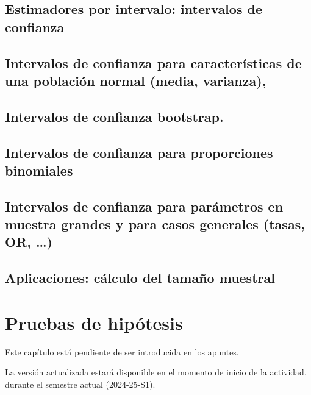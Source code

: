 \documentclass[
  a4paper,
  DIV=11,
  numbers=noendperiod]{scrreprt}
\begin{document}
\section{Estimadores por intervalo: intervalos de
confianza}\label{estimadores-por-intervalo-intervalos-de-confianza}

\section{Intervalos de confianza para características de una población
normal (media,
varianza),}\label{intervalos-de-confianza-para-caracteruxedsticas-de-una-poblaciuxf3n-normal-media-varianza}

\section{Intervalos de confianza
bootstrap.}\label{intervalos-de-confianza-bootstrap.}

\section{Intervalos de confianza para proporciones
binomiales}\label{intervalos-de-confianza-para-proporciones-binomiales}

\section{Intervalos de confianza para parámetros en muestra grandes y
para casos generales (tasas, OR,
\ldots)}\label{intervalos-de-confianza-para-paruxe1metros-en-muestra-grandes-y-para-casos-generales-tasas-or}

\section{Aplicaciones: cálculo del tamaño
muestral}\label{aplicaciones-cuxe1lculo-del-tamauxf1o-muestral}


\chapter{Pruebas de hipótesis}\label{pruebas-de-hipuxf3tesis}

Este capítulo está pendiente de ser introducida en los apuntes.

La versión actualizada estará disponible en el momento de inicio de la
actividad, durante el semestre actual (2024-25-S1).
\end{document}
